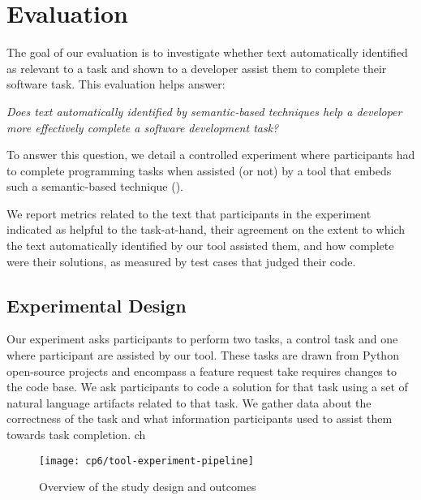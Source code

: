 \clearpage

\section{Evaluation}
\label{cp6:evaluation}


The goal of our evaluation is to investigate whether text automatically identified
as relevant to a task and shown to a developer assist them to complete their software task.
This evaluation helps answer: 


\medskip
\begin{bluequote}
    \textit{ Does text automatically identified by semantic-based techniques help a 
    developer more effectively complete a software development task?} 
\end{bluequote}


To answer this question, we detail a controlled experiment where participants 
had to complete  programming tasks when assisted (or not) by a
 tool that embeds such a semantic-based technique (). 


We report metrics related to the text that participants in the experiment indicated as helpful to the task-at-hand, their agreement on the extent to which the text automatically identified by our tool 
assisted them, and how complete were their solutions, as measured by test cases that judged
their code.


\subsection{Experimental Design}

Our experiment asks participants to perform two tasks, a control task and one where participant are assisted by our tool.
These tasks are drawn from Python open-source projects and encompass a feature request take requires changes to the code base.
We ask participants to code a solution for that task using a set of natural language artifacts related to that task.
We gather data about the correctness of the task and what information participants used to assist them towards task completion.
ch
\clearpage

\begin{figure}
    \centering
    \texttt{[image: cp6/tool-experiment-pipeline]}
    \caption{Overview of the study design and outcomes}
    \label{fig:cp6-experiment-overview}
\end{figure}

\clearpage

